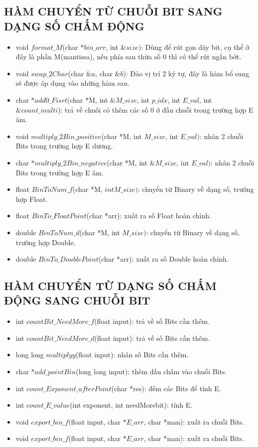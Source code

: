 \documentclass[12pt,a4paper]{article}
\begin{document}
\Large \subsection{\color{blue}\textbf{HÀM CHUYỂN TỪ CHUỖI BIT SANG DẠNG SỐ CHẤM ĐỘNG} }
\begin{itemize}
    \item void $format\_M$(char $*bin\_arr$, int $\&size)$: Dùng để rút gọn dãy bit, cụ thể ở đây là phần M(mantissa), nếu phía sau thừa số 0 thì có thể rút ngắn bớt.
    \item void $swap\_2Char$(char $\&a$, char $\&b$): Đảo vị trí 2 ký tự, đây là hàm bổ sung sẽ được áp dụng vào những hàm sau.
    \item char $*add0\_Fisrt$(char *M, int $\&M\_size$, int $p\_idx$, int $E\_val$, int $\&count\_multi$): trả về chuối có thêm các số 0 ở đầu chuỗi trong trường hợp E âm.
    \item void $multiply\_2Bin\_positive$(char *M, int $M\_size$, int $E\_val)$: nhân 2 chuỗi Bits trong trường hợp E dương.
    \item char $*multiply\_2Bin\_negative$(char *M, int $\&M\_size$, int $E\_val)$: nhân 2 chuỗi Bits trong trường hợp E âm.
    \item float $BinToNum\_f$(char *M, $int M\_size)$: chuyển từ Binary về dạng số, trường hợp Float.
    \item float $BinTo\_FloatPoint$(char *arr): xuất ra số Float hoàn chỉnh.
    \item double $BinToNum\_d$(char *M, int $M\_size)$: chuyển từ Binary về dạng số, trường hợp Double.
    \item double $BinTo\_DoublePoint$(char *arr): xuất ra số Double hoàn chỉnh.
\end{itemize}
\Large \subsection{\color{blue}\textbf{HÀM CHUYỂN TỪ DẠNG SỐ CHẤM ĐỘNG SANG CHUỖI BIT} }
\begin{itemize}
    \item int $countBit\_NeedMore\_f$(float input): trả về số Bits cần thêm.
    \item int $countBit\_NeedMore\_d$(float input): trả về số Bits cần thêm.
    \item long long $multiplyy$(float input): nhân số Bits cần thêm.
    \item char $*add\_pointBin$(long long input): thêm dấu chấm vào chuỗi Bits.
    \item int $count\_Exponent\_afterPoint$(char *res): đếm các Bits để tính E.
    \item int $count\_E\_value$(int exponent, int needMorebit): tính E.
    \item void $export\_bin\_f$(float input, char $*E\_arr$, char *man): xuất ra chuỗi Bits.
    \item void $export\_bin\_f$(float input, char $*E\_arr$, char *man): xuất ra chuỗi Bits.
\end{itemize}
\end{document}
